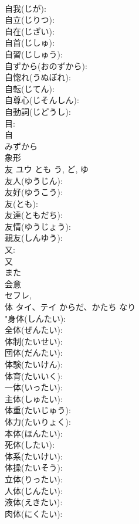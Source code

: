 \documentclass[8pt]{extreport}
\begin{document}
\begin{CJK}{UTF8}{min}
\\	自我(じが): 
\\	自立(じりつ): 
\\	自在(じざい): 
\\	自首(じしゅ): 
\\	自習(じしゅう): 
\\	自ずから(おのずから): 
\\	自惚れ(うぬぼれ): 
\\	自転(じてん): 
\\	自尊心(じそんしん): 
\\	自動詞(じどうし): 
\\	目: 
\\	自	
\\	みずから	
\\	象形 
\\	友	ユウ	とも	う, ど, ゆ	
\\	友人(ゆうじん): 
\\	友好(ゆうこう): 
\\	友(とも): 
\\	友達(ともだち): 
\\	友情(ゆうじょう): 
\\	親友(しんゆう): 
\\	又: 
\\	又	
\\	また	
\\	会意 
\\	セフレ, 
\\	体	タイ、テイ	からだ、かたち	なり	
\\	"身体(しんたい): 
\\	全体(ぜんたい): 
\\	体制(たいせい): 
\\	団体(だんたい): 
\\	体験(たいけん): 
\\	体育(たいいく): 
\\	一体(いったい): 
\\	主体(しゅたい): 
\\	体重(たいじゅう): 
\\	体力(たいりょく): 
\\	本体(ほんたい): 
\\	死体(したい): 
\\	体系(たいけい): 
\\	体操(たいそう): 
\\	立体(りったい): 
\\	人体(じんたい): 
\\	液体(えきたい): 
\\	肉体(にくたい): 

\end{CJK}
\end{document}
